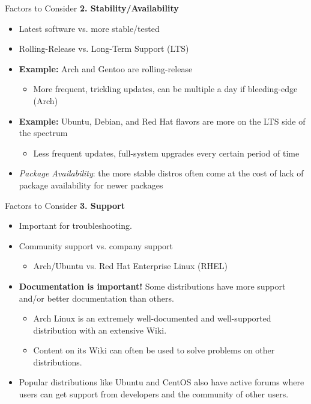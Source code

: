 \documentclass[11pt]{beamer}
\begin{document}
\begin{frame}[t]{Factors to Consider}
	\textbf{\LARGE 2. Stability/Availability}
	\begin{itemize}
		\item Latest software vs. more stable/tested
		\item Rolling-Release vs. Long-Term Support (LTS)
		\item \textbf{Example:} Arch and Gentoo are rolling-release
		\begin{itemize}
			\item More frequent, trickling updates, can be multiple a day if bleeding-edge (Arch)
		\end{itemize}
		\item \textbf{Example:} Ubuntu, Debian, and Red Hat flavors are more on the LTS side of the spectrum
		\begin{itemize}
			\item Less frequent updates, full-system upgrades every certain period of time
		\end{itemize}
		\item \textit{Package Availability}: the more stable distros often come at the cost of lack of package availability for newer packages
	\end{itemize}
\end{frame}

\begin{frame}[t]{Factors to Consider}
	\textbf{\LARGE 3. Support}
	\begin{itemize}
		\item Important for troubleshooting.
		\item Community support vs. company support
		\begin{itemize}
			\item Arch/Ubuntu vs. Red Hat Enterprise Linux (RHEL)
		\end{itemize}
		\item \textbf{Documentation is important!} Some distributions have more support and/or better documentation than others.
		\begin{itemize}
			\item Arch Linux is an extremely well-documented and well-supported distribution with an extensive Wiki.
			\item Content on its Wiki can often be used to solve problems on other distributions.
		\end{itemize}
		\item Popular distributions like Ubuntu and CentOS also have active forums where users can get support from developers and the community of other users.
	\end{itemize}
\end{frame}
\end{document}

